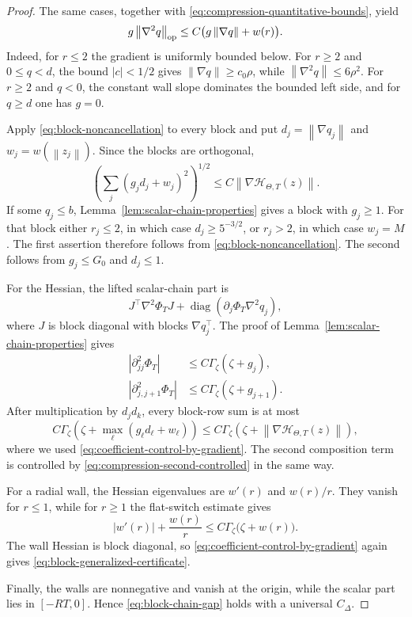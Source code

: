 \documentclass[11pt,a4paper]{article}
\newcommand{\norm}[1]{\left\lVert #1\right\rVert}
\theoremstyle{remark}
\begin{document}
\begin{proof}
The same cases, together with
\eqref{eq:compression-quantitative-bounds}, yield
\begin{equation}
 g\norm{\nabla^2q}_{\rm op}
 \le C\bigl(g\norm{\nabla q}+w(r)\bigr).
 \label{eq:compression-second-controlled}
\end{equation}
Indeed, for $r\le2$ the gradient is uniformly bounded below.  For $r\ge2$
and $0\le q<d$, the bound $|c|<1/2$ gives
$\norm{\nabla q}\ge c_0\rho$, while
$\norm{\nabla^2q}\le6\rho^2$.  For $r\ge2$ and $q<0$, the constant wall
slope dominates the bounded left side, and for $q\ge d$ one has $g=0$.

Apply \eqref{eq:block-noncancellation} to every block and put
$d_j=\norm{\nabla q_j}$ and $w_j=w(\norm{z_j})$.  Since the blocks are
orthogonal,
\begin{equation}
 \left(\sum_j(g_jd_j+w_j)^2\right)^{1/2}
 \le C\norm{\nabla\mathcal H_{\Theta,T}(z)}.
 \label{eq:coefficient-control-by-gradient}
\end{equation}
If some $q_j\le b$, Lemma~\ref{lem:scalar-chain-properties} gives a block
with $g_j\ge1$.  For that block either $r_j\le2$, in which case
$d_j\ge5^{-3/2}$, or $r_j>2$, in which case $w_j=M$.  The first assertion
therefore follows from \eqref{eq:block-noncancellation}.  The second follows
from $g_j\le G_0$ and $d_j\le1$.

For the Hessian, the lifted scalar-chain part is
\[
 J^\top\nabla^2\Phi_TJ
 +\operatorname{diag}(\partial_j\Phi_T\nabla^2q_j),
\]
where $J$ is block diagonal with blocks $\nabla q_j^\top$.  The proof of
Lemma~\ref{lem:scalar-chain-properties} gives
\begin{align*}
 |\partial_{jj}^2\Phi_T|
 &\le C\Gamma_\zeta(\zeta+g_j),\\
 |\partial_{j,j+1}^2\Phi_T|
 &\le C\Gamma_\zeta(\zeta+g_{j+1}).
\end{align*}
After multiplication by $d_jd_k$, every block-row sum is at most
\[
 C\Gamma_\zeta
 \left(\zeta+\max_\ell(g_\ell d_\ell+w_\ell)\right)
 \le C\Gamma_\zeta
 \left(\zeta+\norm{\nabla\mathcal H_{\Theta,T}(z)}\right),
\]
where we used \eqref{eq:coefficient-control-by-gradient}.  The second
composition term is controlled by
\eqref{eq:compression-second-controlled} in the same way.

For a radial wall, the Hessian eigenvalues are $w'(r)$ and $w(r)/r$.
They vanish for $r\le1$, while for $r\ge1$ the flat-switch estimate gives
\[
 |w'(r)|+\frac{w(r)}r
 \le C\Gamma_\zeta\bigl(\zeta+w(r)\bigr).
\]
The wall Hessian is block diagonal, so
\eqref{eq:coefficient-control-by-gradient} again gives
\eqref{eq:block-generalized-certificate}.

Finally, the walls are nonnegative and vanish at the origin, while the scalar
part lies in $[-RT,0]$.  Hence
\eqref{eq:block-chain-gap} holds with a universal $C_\Delta$.
\end{proof}
\end{document}
